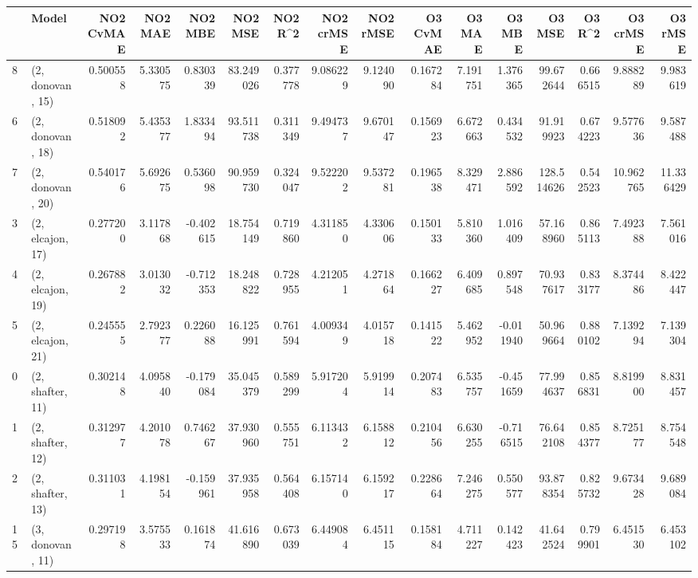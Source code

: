 \begin{tabular}{llrrrrrrrrrrrrrr}
\toprule
{} &             Model &  NO2 CvMAE &   NO2 MAE &   NO2 MBE &    NO2 MSE &   NO2 R\textasciicircum2 &  NO2 crMSE &  NO2 rMSE &  O3 CvMAE &     O3 MAE &    O3 MBE &      O3 MSE &    O3 R\textasciicircum2 &   O3 crMSE &    O3 rMSE \\
\midrule
8  &  (2, donovan, 15) &   0.500558 &  5.330575 &  0.830339 &  83.249026 &  0.377778 &   9.086229 &  9.124090 &  0.167284 &   7.191751 &  1.376365 &   99.672644 &  0.666515 &   9.888289 &   9.983619 \\
6  &  (2, donovan, 18) &   0.518092 &  5.435377 &  1.833494 &  93.511738 &  0.311349 &   9.494737 &  9.670147 &  0.156923 &   6.672663 &  0.434532 &   91.919923 &  0.674223 &   9.577636 &   9.587488 \\
7  &  (2, donovan, 20) &   0.540176 &  5.692675 &  0.536098 &  90.959730 &  0.324047 &   9.522202 &  9.537281 &  0.196538 &   8.329471 &  2.886592 &  128.514626 &  0.542523 &  10.962765 &  11.336429 \\
3  &  (2, elcajon, 17) &   0.277200 &  3.117868 & -0.402615 &  18.754149 &  0.719860 &   4.311850 &  4.330606 &  0.150133 &   5.810360 &  1.016409 &   57.168960 &  0.865113 &   7.492388 &   7.561016 \\
4  &  (2, elcajon, 19) &   0.267882 &  3.013032 & -0.712353 &  18.248822 &  0.728955 &   4.212051 &  4.271864 &  0.166227 &   6.409685 &  0.897548 &   70.937617 &  0.833177 &   8.374486 &   8.422447 \\
5  &  (2, elcajon, 21) &   0.245555 &  2.792377 &  0.226088 &  16.125991 &  0.761594 &   4.009349 &  4.015718 &  0.141522 &   5.462952 & -0.011940 &   50.969664 &  0.880102 &   7.139294 &   7.139304 \\
0  &  (2, shafter, 11) &   0.302148 &  4.095840 & -0.179084 &  35.045379 &  0.589299 &   5.917204 &  5.919914 &  0.207483 &   6.535757 & -0.451659 &   77.994637 &  0.856831 &   8.819900 &   8.831457 \\
1  &  (2, shafter, 12) &   0.312977 &  4.201078 &  0.746267 &  37.930960 &  0.555751 &   6.113432 &  6.158812 &  0.210456 &   6.630255 & -0.716515 &   76.642108 &  0.854377 &   8.725177 &   8.754548 \\
2  &  (2, shafter, 13) &   0.311031 &  4.198154 & -0.159961 &  37.935958 &  0.564408 &   6.157140 &  6.159217 &  0.228664 &   7.246275 &  0.550577 &   93.878354 &  0.825732 &   9.673428 &   9.689084 \\
15 &  (3, donovan, 11) &   0.297198 &  3.575533 &  0.161874 &  41.616890 &  0.673039 &   6.449084 &  6.451115 &  0.158184 &   4.711227 &  0.142423 &   41.642524 &  0.799901 &   6.451530 &   6.453102 \\

\end{tabular}
